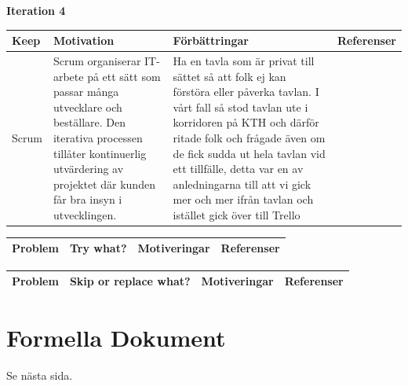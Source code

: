\documentclass[conference,a4paper]{IEEEtran}
\newcommand\Tstrut{\rule{0pt}{2.6ex}}       %
\newcommand\Bstrut{\rule[-0.9ex]{0pt}{0pt}} %
\newcommand{\TBstrut}{\Tstrut\Bstrut} %
\begin{document}
\textbf{Iteration 4}


\begin{table}[H]
	\small
  \centering
	\begin{tabular}{|p{1.5cm}|p{2cm}|p{1.8cm}|p{1.5cm}|} %
    \hline
    Keep & Motivation & Förbättringar & Referenser \TBstrut \\
    \hline
    Scrum & Scrum organiserar IT-arbete på ett sätt som passar många utvecklare och beställare. Den iterativa processen tillåter kontinuerlig utvärdering av projektet där kunden får bra insyn i utvecklingen. & Ha en tavla som är privat till sättet så att folk ej kan förstöra eller påverka tavlan. I vårt fall så stod tavlan ute i korridoren på KTH och därför ritade folk och frågade även om de fick sudda ut hela tavlan vid ett tillfälle, detta var en av anledningarna till att vi gick mer och mer ifrån tavlan och istället gick över till Trello & \TBstrut \\
    \hline
  \end{tabular}
\end{table}

\begin{table}[H]
	\small
  \centering
	\begin{tabular}{|p{1.5cm}|p{2cm}|p{1.8cm}|p{1.5cm}|} %
    \hline
    Problem & Try what? & Motiveringar & Referenser \TBstrut \\
    \hline
  \end{tabular}
\end{table}

\begin{table}[H]
	\small
  \centering
	\begin{tabular}{|p{1.5cm}|p{2cm}|p{1.8cm}|p{1.5cm}|} %
    \hline
    Problem & Skip or replace what? & Motiveringar & Referenser \TBstrut \\
    \hline
  \end{tabular}
\end{table}

\section{Formella Dokument}
Se nästa sida.
\newpage
\null%
\newpage



\end{document}
